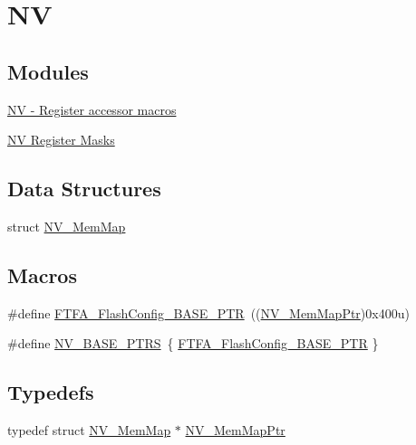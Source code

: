\hypertarget{group___n_v___peripheral}{}\section{NV}
\label{group___n_v___peripheral}
\subsection*{Modules}
\begin{DoxyCompactItemize}
\item 
\hyperlink{group___n_v___register___accessor___macros}{N\+V -\/ Register accessor macros}
\item 
\hyperlink{group___n_v___register___masks}{N\+V Register Masks}
\end{DoxyCompactItemize}
\subsection*{Data Structures}
\begin{DoxyCompactItemize}
\item 
struct \hyperlink{struct_n_v___mem_map}{N\+V\+\_\+\+Mem\+Map}
\end{DoxyCompactItemize}
\subsection*{Macros}
\begin{DoxyCompactItemize}
\item 
\#define \hyperlink{group___n_v___peripheral_ga3458652dfc38239f92682556e63596b5}{F\+T\+F\+A\+\_\+\+Flash\+Config\+\_\+\+B\+A\+S\+E\+\_\+\+P\+TR}~((\hyperlink{group___n_v___peripheral_ga9aac431b01e6b976f2f4e32409ab725f}{N\+V\+\_\+\+Mem\+Map\+Ptr})0x400u)
\item 
\#define \hyperlink{group___n_v___peripheral_ga1e44e66a8945b675dcebb6fbd6bdc85b}{N\+V\+\_\+\+B\+A\+S\+E\+\_\+\+P\+T\+RS}~\{ \hyperlink{group___n_v___peripheral_ga3458652dfc38239f92682556e63596b5}{F\+T\+F\+A\+\_\+\+Flash\+Config\+\_\+\+B\+A\+S\+E\+\_\+\+P\+TR} \}
\end{DoxyCompactItemize}
\subsection*{Typedefs}
\begin{DoxyCompactItemize}
\item 
typedef struct \hyperlink{struct_n_v___mem_map}{N\+V\+\_\+\+Mem\+Map} $\ast$ \hyperlink{group___n_v___peripheral_ga9aac431b01e6b976f2f4e32409ab725f}{N\+V\+\_\+\+Mem\+Map\+Ptr}
\end{DoxyCompactItemize}


